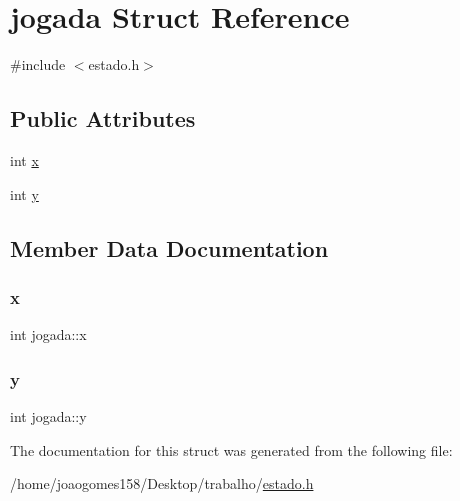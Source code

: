 \hypertarget{structjogada}{}\section{jogada Struct Reference}
\label{structjogada}


{\ttfamily \#include $<$estado.\+h$>$}

\subsection*{Public Attributes}
\begin{DoxyCompactItemize}
\item 
int \hyperlink{structjogada_a0c6fcf41480ddc917fc3d0e3d4233ffc}{x}
\item 
int \hyperlink{structjogada_a021ae333aef47c6a60263a5686da4b07}{y}
\end{DoxyCompactItemize}


\subsection{Member Data Documentation}
\mbox{\label{structjogada_a0c6fcf41480ddc917fc3d0e3d4233ffc}} 
\subsubsection{\texorpdfstring{x}{x}}
{\footnotesize\ttfamily int jogada\+::x}

\mbox{\label{structjogada_a021ae333aef47c6a60263a5686da4b07}} 
\subsubsection{\texorpdfstring{y}{y}}
{\footnotesize\ttfamily int jogada\+::y}



The documentation for this struct was generated from the following file\+:\begin{DoxyCompactItemize}
\item 
/home/joaogomes158/\+Desktop/trabalho/\hyperlink{estado_8h}{estado.\+h}\end{DoxyCompactItemize}
